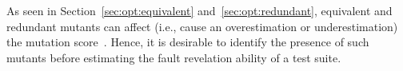 

As seen in Section~\ref{sec:opt:equivalent} and~\ref{sec:opt:redundant}, equivalent and redundant mutants can affect (i.e., cause an overestimation or underestimation) the mutation score~\cite{papadakis2016threats,kintis2017detecting}.
Hence, it is desirable to identify the presence of such mutants before estimating the fault revelation ability of a test suite.
